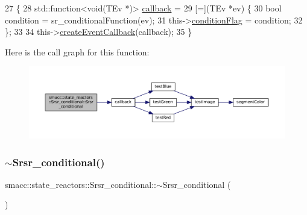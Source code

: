 \begin{DoxyCode}
27     \{
28         std::function<void(TEv *)> \hyperlink{servers_2opencv__perception__node_2opencv__perception__node_8cpp_a050e697bd654facce10ea3f6549669b3}{callback} =
29             [=](TEv *ev) \{
30                 \textcolor{keywordtype}{bool} condition = sr\_conditionalFunction(ev);
31                 this->\hyperlink{classsmacc_1_1state__reactors_1_1Srsr__conditional_a2c1c6a4acf1429526fe8c84e66479fbc}{conditionFlag} = condition;
32             \};
33 
34         this->\hyperlink{classsmacc_1_1StateReactor_a68482e08f6449694a0bcda843b14b376}{createEventCallback}(callback);
35     \}
\end{DoxyCode}
Here is the call graph for this function\+:
\nopagebreak
\begin{figure}[H]
\begin{center}
\leavevmode
\includegraphics[width=350pt]{classsmacc_1_1state__reactors_1_1Srsr__conditional_a4f36ec873e26c4a8288f08f4d68924d3_cgraph}
\end{center}
\end{figure}
\mbox{\label{classsmacc_1_1state__reactors_1_1Srsr__conditional_a711473830935c7c4fb1d0939e41fb2cb}} 
\subsubsection{\texorpdfstring{$\sim$\+Srsr\+\_\+conditional()}{~Srsr\_conditional()}}
{\footnotesize\ttfamily smacc\+::state\+\_\+reactors\+::\+Srsr\+\_\+conditional\+::$\sim$\+Srsr\+\_\+conditional (\begin{DoxyParamCaption}{ }\end{DoxyParamCaption})}



